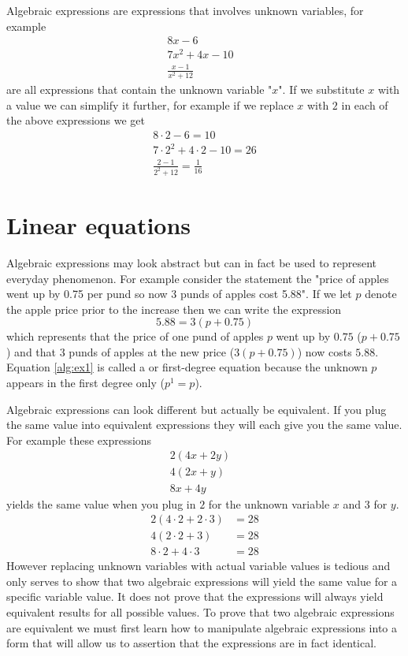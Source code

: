 Algebraic expressions are expressions that involves unknown variables, for example
\begin{align*}
8x - 6               &   \\
7x^2 + 4x - 10       &  \\
\frac{x-1}{x^2 + 12} &
\end{align*}
are all expressions that contain the unknown variable "$x$". If we substitute $x$ with a value we can simplify it further, for example if we replace $x$ with $2$ in each of the above expressions we get
\begin{align*}
8 \cdot 2 - 6 = 10                \\
7 \cdot 2^2 + 4 \cdot 2 - 10 = 26 \\
\frac{2-1}{2^2 + 12} = \frac{1}{16}
\end{align*}

\section{Linear equations}
Algebraic expressions may look abstract but can in fact be used to represent everyday phenomenon. For example consider the statement the "price of apples went up by 0.75 per pund so now 3 punds of apples cost 5.88". If we let $p$ denote the apple price prior to the increase then we can write the expression
\begin{equation}\label{alg:ex1}
5.88 = 3(p + 0.75)
\end{equation}
which represents that the price of one pund of apples $p$ went up by $0.75$ ($p + 0.75$) and that $3$ punds of apples at the new price ($3(p + 0.75)$) now costs $5.88$. Equation \ref{alg:ex1} is called a  or first-degree equation because the unknown $p$ appears in the first degree only ($p^1 = p$).

Algebraic expressions can look different but actually be equivalent. If you plug the same value into equivalent expressions they will each give you the same value. For example these expressions
\begin{align*}
2(4x+2y) &   \\
4(2x+y)  &  \\
8x+4y         &
\end{align*}
yields the same value when you plug in $2$ for the unknown variable $x$ and $3$ for $y$.
\begin{align*}
2(4 \cdot 2 + 2 \cdot 3)  &= 28\\
4(2 \cdot 2 + 3)          &= 28\\
8 \cdot 2 + 4 \cdot 3     &= 28
\end{align*}
However replacing unknown variables with actual variable values is tedious and only serves to show that two algebraic expressions will yield the same value for a specific variable value. It does not prove that the expressions will always yield equivalent results for all possible values. To prove that two algebraic expressions are equivalent we must first learn how to manipulate algebraic expressions into a form that will allow us to assertion that the expressions are in fact identical.

